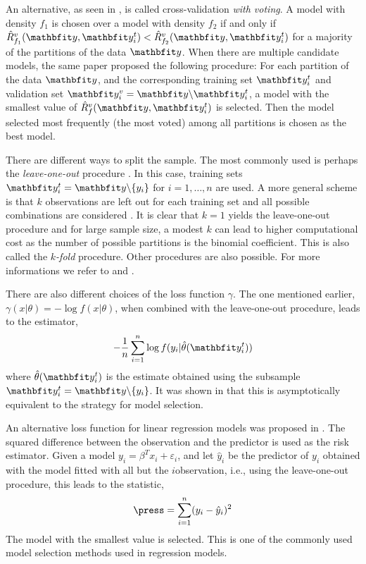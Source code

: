 An alternative, as seen in \cite{Yang:2007vx}, is called cross-validation
\emph{with voting}. A model with density $f_1$ is chosen over a model with
density $f_2$ if and only if $\hat{R}_{f_1}^v(\data,\data_i^t) <
\hat{R}_{f_2}^v(\data,\data_i^t)$ for a majority of the partitions of the
data $\data$. When there are multiple candidate models, the same paper
proposed the following procedure: For each partition of the data $\data$, and
the corresponding training set $\data_i^t$ and validation set $\data_i^v =
\data\backslash\data_i^t$, a model with the smallest value of
$\hat{R}_f^v(\data,\data_i^t)$ is selected. Then the model selected most
frequently (the most voted) among all partitions is chosen as the best model.

There are different ways to split the sample. The most commonly used is
perhaps the \emph{leave-one-out} procedure
\cite{Stone:1974vx,Geisser:1975vx}. In this case, training sets $\data_i^t =
\data\backslash\{y_i\}$ for $i = 1,\dots,n$ are used. A more general scheme
is that $k$ observations are left out for each training set and all possible
combinations are considered \cite{Shao:1993vx}. It is clear that $k=1$ yields
the leave-one-out procedure and for large sample size, a modest $k$ can lead
to higher computational cost as the number of possible partitions is the
binomial coefficient. This is also called the $k$\emph{-fold} procedure.
Other procedures are also possible. For more informations we refer to
\cite{Stone:1978vx} and \cite{Hjorth:1994vx}.

There are also different choices of the loss function $\gamma$. The one
mentioned earlier, $\gamma(x|\theta) = -\log f(x|\theta)$, when combined with
the leave-one-out procedure, leads to the estimator,
\begin{equation}
  -\frac{1}{n}\sum_{i=1}^n\log f(y_i|\hat\theta(\data_i^t))
\end{equation}
where $\hat\theta(\data_i^t)$ is the estimate obtained using the subsample
$\data_i^t = \data\backslash\{y_i\}$. It was shown in \cite{Stone:1978vx} that
this is asymptotically equivalent to the \aic strategy for model selection.

An alternative loss function for linear regression models was proposed in
\cite{Allen:1974vx}. The squared difference between the observation and the
predictor is used as the risk estimator. Given a model $y_i = \beta^T x_i +
\varepsilon_i$, and let $\hat{y}_i$ be the predictor of $y_i$ obtained with
the model fitted with all but the $i$\xth observation, i.e., using the
leave-one-out procedure, this leads to the \press statistic,
\begin{equation}
  \press = \sum_{i=1}^n(y_i - \hat{y}_i)^2
\end{equation}
The model with the smallest \press value is selected. This is one of the
commonly used model selection methods used in regression models.

